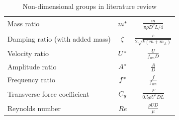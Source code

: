 
\bgroup
\def\arraystretch{2.2}%
	\begin{table}[h]
		\caption{Non-dimensional groups in literature review}
		\centering
		\label{table:non_dimensional_groups}
		\begin{tabular}{l c c }
			\toprule
			Mass ratio & $m^*$ & {\Large $ \frac{m}{\pi \rho D^2 L /4} $}  \\
			
			Damping ratio (with added mass) & $  \zeta $ &{\Large $ \frac{c}{2\sqrt{k(m+m_A)}} $ }\\
			
			Velocity ratio & $ U^* $&{\Large  $ \frac{U}{f_{wn} D} $}\\
			
			Amplitude ratio & $ A^* $ &{\Large $ \frac{A}{D} $  }\\
			
			Frequency ratio & $f^*$ &{\Large  $ \frac{f}{f_{wn}} $}\\
			
			Transverse force coefficient & $ C_y $&{\Large $ \frac{F}{0.5 \rho U^2DL} $}\\ 
	
			Reynolds number & $ Re $ &{\Large $ \frac{\rho UD}{\mu} $}\\
			\bottomrule
		\end{tabular}
	\end{table}
\egroup



